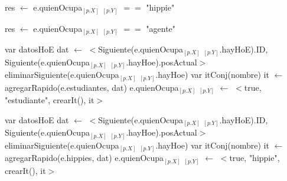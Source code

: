 \begin{algorithm}[H]
\begin{algorithmic}[1]
 
    \State res $\gets$ e.quienOcupa$_{[p.X]}$ $_{[p.Y]}$ $==$ "hippie"
\EndFunction
\end{algorithmic}
\end{algorithm}

\begin{algorithm}[H]
\begin{algorithmic}[1]
 
    \State res $\gets$ e.quienOcupa$_{[p.X]}$ $_{[p.Y]}$ $==$ "agente"
\EndFunction
\end{algorithmic}
\end{algorithm}

\begin{algorithm}[H]
\begin{algorithmic}[1]
 
    \State var datosHoE dat $\gets$ $<$Siguiente(e.quienOcupa$_{[p.X]}$ $_{[p.Y]}$.hayHoE).ID, Siguiente(e.quienOcupa$_{[p.X]}$ $_{[p.Y]}$.hayHoe).posActual$>$ 
    \State eliminarSiguiente(e.quienOcupa$_{[p.X]}$ $_{[p.Y]}$.hayHoe) 
    \State var itConj(nombre) it $\gets$ agregarRapido(e.estudiantes, dat) 
    \State e.quienOcupa$_{[p.X]}$ $_{[p.Y]}$ $\gets$ $<$true, "estudiante", crearIt(), it$>$ 
\EndFunction
\end{algorithmic}
\end{algorithm}

\begin{algorithm}[H]
\begin{algorithmic}[1]
 
    \State var datosHoE dat $\gets$ $<$Siguiente(e.quienOcupa$_{[p.X]}$ $_{[p.Y]}$.hayHoE).ID, Siguiente(e.quienOcupa$_{[p.X]}$ $_{[p.Y]}$.hayHoe).posActual$>$ 
    \State eliminarSiguiente(e.quienOcupa$_{[p.X]}$ $_{[p.Y]}$.hayHoe) 
    \State var itConj(nombre) it $\gets$ agregarRapido(e.hippies, dat) 
    \State e.quienOcupa$_{[p.X]}$ $_{[p.Y]}$ $\gets$ $<$true, "hippie", crearIt(), it$>$ 
\EndFunction
\end{algorithmic}
\end{algorithm}

